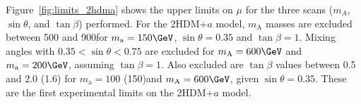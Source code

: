 

Figure~\ref{fig:limits_2hdma} shows the upper limits on $\mu$ for the three scans ($m_A$, $\sin\theta$, and $\tan\beta$) performed.
For the 2HDM+$a$ model, $m_\text{A}$ masses are excluded between 500 and 900\GeV for $m_\text{a}=150\GeV$, $\sin\theta=0.35$ and $\tan\beta=1$. Mixing angles with $0.35<\sin\theta<0.75$ are excluded for $m_\text{A}=600\GeV$ and $m_\text{a}=200\GeV$, assuming $\tan\beta=1$. Also excluded are $\tan\beta$ values between 0.5 and 2.0 (1.6) for $m_\text{a}=100$ (150)\GeV and $m_\text{A}=600\GeV$, given $\sin\theta=0.35$. These are the first experimental limits on the 2HDM+$a$ model.

